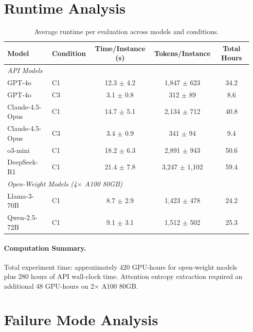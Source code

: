\documentclass{article}
\theoremstyle{plain}
\theoremstyle{definition}
\theoremstyle{remark}
\begin{document}

\section{Runtime Analysis}
\label{app:runtime}

\begin{table}[h]
\centering
\caption{Average runtime per evaluation across models and conditions.}
\label{tab:runtime}
\small
\begin{tabular}{@{}llccc@{}}
\toprule
\textbf{Model} & \textbf{Condition} & \textbf{Time/Instance (s)} & \textbf{Tokens/Instance} & \textbf{Total Hours} \\
\midrule
\multicolumn{5}{l}{\textit{API Models}} \\
GPT-4o & C1 & 12.3 $\pm$ 4.2 & 1,847 $\pm$ 623 & 34.2 \\
GPT-4o & C3 & 3.1 $\pm$ 0.8 & 312 $\pm$ 89 & 8.6 \\
Claude-4.5-Opus & C1 & 14.7 $\pm$ 5.1 & 2,134 $\pm$ 712 & 40.8 \\
Claude-4.5-Opus & C3 & 3.4 $\pm$ 0.9 & 341 $\pm$ 94 & 9.4 \\
o3-mini & C1 & 18.2 $\pm$ 6.3 & 2,891 $\pm$ 943 & 50.6 \\
DeepSeek-R1 & C1 & 21.4 $\pm$ 7.8 & 3,247 $\pm$ 1,102 & 59.4 \\
\midrule
\multicolumn{5}{l}{\textit{Open-Weight Models (4$\times$ A100 80GB)}} \\
Llama-3-70B & C1 & 8.7 $\pm$ 2.9 & 1,423 $\pm$ 478 & 24.2 \\
Qwen-2.5-72B & C1 & 9.1 $\pm$ 3.1 & 1,512 $\pm$ 502 & 25.3 \\
\bottomrule
\end{tabular}
\end{table}

\paragraph{Computation Summary.} Total experiment time: approximately 420 GPU-hours for open-weight models plus 280 hours of API wall-clock time. Attention entropy extraction required an additional 48 GPU-hours on 2$\times$ A100 80GB.


\section{Failure Mode Analysis}
\label{app:failures}
\end{document}

